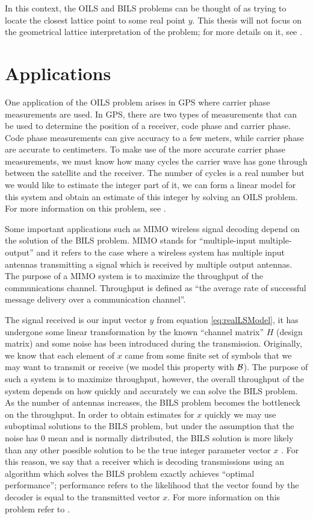 \documentclass[12pt,Bold,letterpaper]{mcgilletdclass}
\newcommand{\boxcon}{{\cal B}}
\newcommand{\vsp}{\vspace{\baselineskip}}
\begin{document}
In this context, the OILS and BILS problems can be thought of as trying to locate the closest lattice point to some real point $y$. This thesis will not focus on the geometrical lattice interpretation of the problem; for more details on it, see \cite{AgrEVZ02}.

\vsp \section{Applications}
One application of the OILS problem arises in GPS where carrier phase measurements are used. In GPS, there are two types of measurements that can be used to determine the position of a receiver, code phase and carrier phase. Code phase measurements can give accuracy to a few meters, while carrier phase are accurate to centimeters. To make use of the more accurate carrier phase measurements, we must know how many cycles the carrier wave has gone through between the satellite and the receiver. The number of cycles is a real number but we would like to estimate the integer part of it, we can form a linear model for this system and obtain an estimate of this integer by solving an OILS problem. For more information on this problem, see \cite{Xu07}. 

Some important applications such as MIMO wireless signal decoding depend on the
solution of the BILS problem. MIMO stands for ``multiple-input
multiple-output'' and it refers to the case where a wireless system has multiple
input antennas transmitting a signal which is received by multiple output
antennas. The purpose of a MIMO system is to maximize the throughput of the communications channel. Throughput is defined as ``the average rate of successful message delivery over a communication channel''. 

The signal received is our input vector $y$ from
equation \eqref{eq:realLSModel}, it has undergone some linear transformation by the known
``channel matrix'' $H$ (design matrix) and some noise has been introduced during
the transmission. Originally, we know that each element of $x$ came from some
finite set of symbols that we may want to transmit or receive (we model
this property with $\boxcon$). The purpose of such a system is to maximize
throughput, however, the overall throughput of the system depends on how
quickly and accurately we can solve the BILS problem. As the number of antennas increases, the BILS problem becomes the bottleneck on the throughput. In order to obtain estimates for $x$ quickly we may use suboptimal solutions to the BILS problem, but under the assumption that the noise has $0$ mean and is
normally distributed, the BILS solution is more likely than any other possible
solution to be the true integer parameter vector $x$ \cite{Han11}. For this reason, we say that a receiver which is decoding transmissions using an algorithm which solves the BILS problem exactly achieves ``optimal performance''; performance refers to the likelihood that the vector found by the decoder is equal to the transmitted vector $x$. For more information on this problem refer to \cite{Jan04}.
\end{document}
